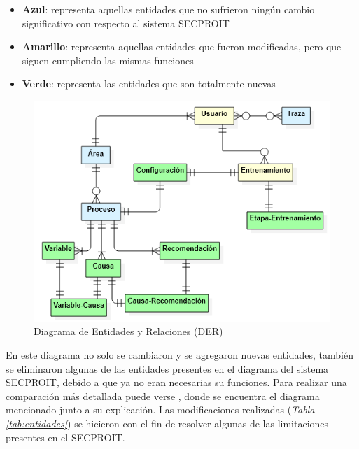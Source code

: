 \begin{itemize}
\item \textbf{Azul}: representa aquellas entidades que no sufrieron ningún cambio significativo con respecto al sistema SECPROIT
\item \textbf{Amarillo}: representa aquellas entidades que fueron modificadas, pero que siguen cumpliendo las mismas funciones
\item \textbf{Verde}: representa las entidades que son totalmente nuevas
\end{itemize}

\begin{figure}[h]
\centering
 \includegraphics[width=0.65\linewidth]{imagen/der.png}
 \caption{Diagrama de Entidades y Relaciones (DER)}
 \label{fig:der} 
\end{figure}

En este diagrama no solo se cambiaron y se agregaron nuevas entidades, también se eliminaron algunas de las entidades presentes en el diagrama del sistema SECPROIT, debido a que ya no eran necesarias su funciones. Para realizar una comparación más detallada puede verse \cite{ElenaAcostaGil2018}, donde se encuentra el diagrama mencionado junto a su explicación. Las modificaciones realizadas (\textsl{Tabla \ref{tab:entidades}}) se hicieron con el fin de resolver algunas de las limitaciones presentes en el SECPROIT.

